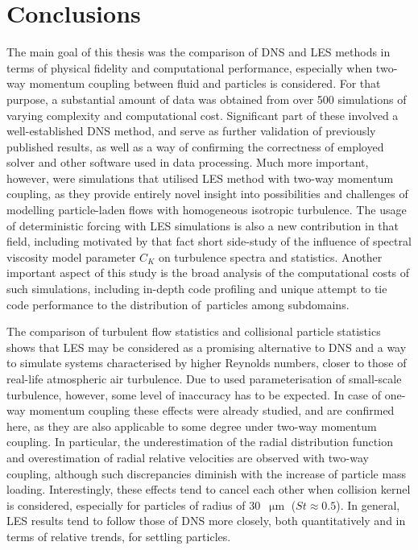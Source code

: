 \documentclass{pracamgren}
\begin{document}
\chapter*{Conclusions}
\label{ch:end}

The main goal of this thesis was the comparison of DNS and LES methods in terms of physical fidelity and computational performance, especially when two-way momentum coupling between fluid and particles is considered.
For that purpose, a substantial amount of data was obtained from over 500 simulations of varying complexity and computational cost.
Significant part of these involved a well-established DNS method, and serve as further validation of previously published results, as well as a way of confirming the correctness of employed solver and other software used in data processing.
Much more important, however, were simulations that utilised LES method with two-way momentum coupling, as they provide entirely novel insight into possibilities and challenges of modelling particle-laden flows with homogeneous isotropic turbulence.
The usage of deterministic forcing with LES simulations is also a new contribution in that field, including motivated by that fact short side-study of the influence of spectral viscosity model parameter $C_K$ on turbulence spectra and statistics.
Another important aspect of this study is the broad analysis of the computational costs of such simulations, including in-depth code profiling and unique attempt to tie code performance to the distribution of~particles among subdomains.

The comparison of turbulent flow statistics and collisional particle statistics shows that LES may be considered as a promising alternative to DNS and a way to simulate systems characterised by higher Reynolds numbers, closer to those of real-life atmospheric air turbulence.
Due to used parameterisation of small-scale turbulence, however, some level of inaccuracy has to be expected.
In case of one-way momentum coupling these effects were already studied, and are confirmed here, as they are also applicable to some degree under two-way momentum coupling.
In particular, the underestimation of the radial distribution function and overestimation of radial relative velocities are observed with two-way coupling, although such discrepancies diminish with the increase of particle mass loading.
Interestingly, these effects tend to cancel each other when collision kernel is considered, especially for particles of radius of $30$~$\upmu\text{m}$ ($St \approx 0.5$).
In general, LES results tend to follow those of DNS more closely, both quantitatively and in terms of relative trends, for settling particles.
\end{document}
